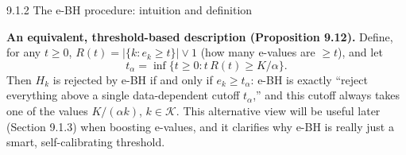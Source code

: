 \documentclass[aspectratio=169,10pt]{beamer}
\newcommand{\Kc}{\mathcal{K}}
\begin{document}
\begin{frame}[allowframebreaks]{9.1.2 The e-BH procedure: intuition and definition}
\framebreak

\textbf{An equivalent, threshold-based description (Proposition 9.12).} Define, for any $t \ge 0$, $R(t) = |\{k : e_k \ge t\}| \vee 1$ (how many e-values are $\ge t$), and let
\[
t_\alpha = \inf\{ t \ge 0 : t\, R(t) \ge K/\alpha \}.
\]
Then $H_k$ is rejected by e-BH if and only if $e_k \ge t_\alpha$: e-BH is exactly ``reject everything above a single data-dependent cutoff $t_\alpha$,'' and this cutoff always takes one of the values $K/(\alpha k)$, $k \in \Kc$. This alternative view will be useful later (Section 9.1.3) when boosting e-values, and it clarifies why e-BH is really just a smart, self-calibrating threshold.

\end{frame}

\end{document}
